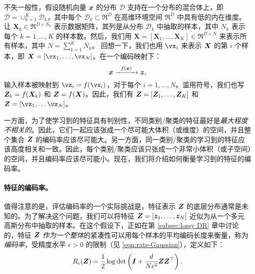 \documentclass[../../book-main_zh.tex]{subfiles}
\begin{document}

不失一般性，假设随机向量 $\bm{x}$ 的分布 $\mathcal D$ 支持在一个分布的混合体上，即 $\mathcal D = \cup_{k=1}^K \mathcal{D}_k$，其中每个 $\mathcal{D}_k \subset \Re^D$ 在高维环境空间 $\Re^D$ 中具有低的内在维度。让 $\bm X_k \in \Re^{D\times N_k}$ 表示数据矩阵，其列是从分布 $\mathcal{D}_k$ 中抽取的样本，其中 $N_k$ 表示每个 $k=1,\dots,K$ 的样本数。然后，我们用 $\bm X=[\bm X_1,\dots,\bm X_K] \in \Re^{D\times N}$ 来表示所有样本，其中 $N=\sum_{k=1}^K N_k$。
回想一下，我们也用 $\vx_i$ 来表示 $\bm{X}$ 的第 $i$ 个样本，即 $\X=[\vx_1,\dots,\vx_N]$。在一个编码映射下：
\begin{equation}
	\bm{x}   \xrightarrow{\hspace{2mm} f(\bm{x})\hspace{2mm}} \bm{z},
\end{equation}
输入样本被映射到 $\vz_i = f(\vx_i)$，对于每个 $i=1,\dots,N$。滥用符号，我们也写 $\bm{Z}_k = f(\bm{X}_k)$ 和 $\bm{Z} = f(\bm{X})$。因此，我们有 $\bm{Z} = [\bm Z_1,\dots,\bm Z_K]$ 和 $\Z = [\vz_1,\dots\vz_N]$。

一方面，为了使学习到的特征具有判别性，不同类别/聚类的特征最好是{\em 最大程度不相关的}。因此，它们一起应该张成一个尽可能大体积（或维度）的空间，并且整个集合 $\bm{Z}$ 的编码率应该尽可能大。另一方面，同一类别/聚类的学习到的特征应该高度相关和一致。因此，每个类别/聚类应该只张成一个非常小体积（或子空间）的空间，并且编码率应该尽可能小。现在，我们将介绍如何衡量学习到的特征的编码率。

\paragraph{特征的编码率。} 值得注意的是，评估编码率的一个实际挑战是，特征表示 $\bm{Z}$ 的底层分布通常是未知的。为了解决这个问题，我们可以将特征 $\bm{Z} = [\bm{z}_1, \ldots, \bm{z}_N]$ 近似为从一个多元高斯分布中抽取的样本。在这个假设下，正如在第 \ref{subsec:lossy DR} 章中讨论的，特征 $\bm{Z}$ {\em 作为一个整体}的紧凑性可以用每个样本的平均编码长度来衡量，称为{\em 编码率}，受精度水平 $\epsilon > 0$ 的限制（见 \eqref{eqn:rate-Gaussian}），定义如下：
\begin{equation}
	R_{\epsilon}(\bm{Z}) = \frac{1}{2}\log\det\left(\bm{I} + \frac{d}{N\epsilon^{2}}\bm{Z}\bm{Z}^{\top}\right).
	\label{chap4-eqn:coding-length-eval}
\end{equation}
\end{document}
